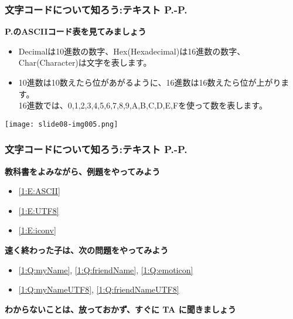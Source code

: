 \begin{frame}[fragile]
	\frametitle{文字コードについて知ろう:テキスト P.\pageref{1:P:charCode}-P.\pageref{1:P:scraping}~~~}
    \large\textbf{P.\pageref{1:P:charCode}のASCIIコード表を見てみましょう}\\
    \begin{minipage}{0.55\textwidth}
        \begin{itemize}
            \item Decimalは10進数の数字、Hex(Hexadecimal)は16進数の数字、Char(Character)は文字を表します。
            \item 10進数は10数えたら位があがるように、16進数は16数えたら位が上がります。\\16進数では、0,1,2,3,4,5,6,7,8,9,A,B,C,D,E,Fを使って数を表します。
        \end{itemize}
    \end{minipage}
    \hfill
    \begin{minipage}{0.4\textwidth}
        {\upshape
            \texttt{[image: slide08-img005.png]}}
    \end{minipage}
\end{frame}

\begin{frame}[fragile]
	\frametitle{文字コードについて知ろう:テキスト P.\pageref{1:P:charCode}-P.\pageref{1:P:scraping}~~~}
      \large\textbf{教科書をよみながら、例題をやってみよう}
				\begin{itemize}
					\item \ref*{1:E:ASCII}
					\item \ref*{1:E:UTF8}
					\item \ref*{1:E:iconv}
				\end{itemize}
      \vfill
      \large\textbf{速く終わった子は、次の問題をやってみよう}
				\begin{itemize}
					\item \ref*{1:Q:myName}, \ref*{1:Q:friendName}, \ref*{1:Q:emoticon}
					\item \ref*{1:Q:myNameUTF8}, \ref*{1:Q:friendNameUTF8}
				\end{itemize}
      \vfill
      \large\textbf{わからないことは、放っておかず、すぐに TA に聞きましょう}
\end{frame}

